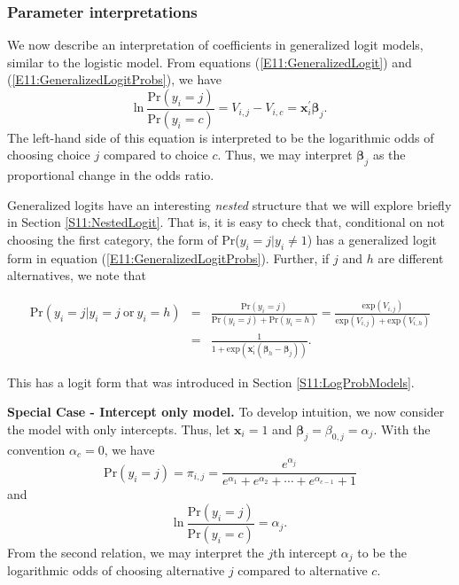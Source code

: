 \subsubsection*{Parameter interpretations}

We now describe an interpretation of coefficients in generalized
logit models, similar to the logistic model. From equations
(\ref{E11:GeneralizedLogit}) and (\ref{E11:GeneralizedLogitProbs}),
we have
\begin{equation*}
\mathrm{ln}~ \frac{\mathrm{Pr} \left(y_i = j \right)} {\mathrm{Pr}
\left(y_i = c \right)} = V_{i,j} - V_{i,c} =\mathbf{x}_i^{\prime}
\boldsymbol \beta_j .
\end{equation*}
The left-hand side of this equation is interpreted to be the
logarithmic odds of choosing choice $j$ compared to choice $c$.
Thus, we may interpret $\boldsymbol \beta_j$  as the proportional
change in the odds ratio.

Generalized logits have an interesting \emph{nested} structure that
we will explore briefly in Section \ref{S11:NestedLogit}. That is,
it is easy to check that, conditional on not choosing the first
category, the form of Pr($y_i = j| y_i \neq 1$) has a generalized
logit form in equation (\ref{E11:GeneralizedLogitProbs}). Further,
if $j$ and $h$ are different alternatives, we note that

\begin{eqnarray*}
\mathrm{Pr}(y_i = j| y_i=j ~\mathrm{or}~ y_i=h)
&=&\frac{\mathrm{Pr}(y_i = j)}{\mathrm{Pr}(y_i = j)+\mathrm{Pr}(y_i
= h)}
=\frac{\mathrm{exp}(V_{i,j})}{\mathrm{exp}(V_{i,j})+\mathrm{exp}(V_{i,h})}
\\
&=&\frac{1}{1+\mathrm{exp}(\mathbf{x}_i^{\prime}(\boldsymbol \beta
_h - \boldsymbol \beta_j))} . \end{eqnarray*} 

\noindent This has a logit form that was introduced in Section
\ref{S11:LogProbModels}.

\textbf{Special Case - Intercept only model.} To develop intuition,
we now consider the model with only intercepts. Thus, let
$\mathbf{x}_i = 1$ and $\boldsymbol \beta_j = \beta_{0,j} =
\alpha_j$. With the convention $\alpha_c=0$, we have
\begin{equation*}
\mathrm{Pr} \left(y_i = j \right) = \pi_{i,j} = \frac
{e^{\alpha_j}}{e^{\alpha_1}+e^{\alpha_2}+\cdots+e^{\alpha_{c-1}}+1}
\end{equation*}
and
\begin{equation*}
\mathrm{ln}~ \frac{\mathrm{Pr} \left(y_i = j \right)} {\mathrm{Pr}
\left(y_i = c \right)} = \alpha_j.
\end{equation*}
From the second relation, we may interpret the $j$th intercept
$\alpha_j$ to be the logarithmic odds of choosing alternative $j$
compared to alternative $c$.

